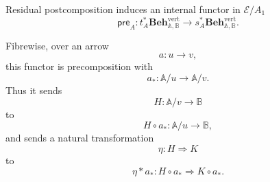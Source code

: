 \begin{theorem}
\label{thm:parametrized-precomposition}
    Residual postcomposition induces an internal functor in
    \(\mathcal E/A_1\)
    \[
        \mathsf{pre}_A:
        t_A^*
        \mathbf{Beh}^{\mathrm{vert}}_{\mathbb A,\mathbb B}
        \longrightarrow
        s_A^*
        \mathbf{Beh}^{\mathrm{vert}}_{\mathbb A,\mathbb B}.
    \]

    Fibrewise, over an arrow
    \[
        a:u\to v,
    \]
    this functor is precomposition with
    \[
        a_*:\mathbb A/u\to\mathbb A/v.
    \]
    Thus it sends
    \[
        H:\mathbb A/v\to\mathbb B
    \]
    to
    \[
        H\circ a_*:\mathbb A/u\to\mathbb B,
    \]
    and sends a natural transformation
    \[
        \eta:H\Rightarrow K
    \]
    to
    \[
        \eta\ast a_*:
        H\circ a_*
        \Rightarrow
        K\circ a_*.
    \]
\end{theorem}
